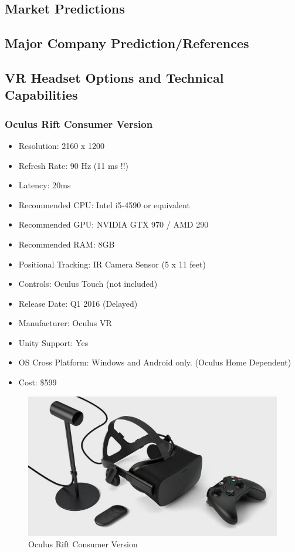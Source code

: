 \documentclass[a4paper,10pt,twoside]{article}
\begin{document}
\subsection{Market Predictions}

\subsection{Major Company Prediction/References}

\subsection{VR Headset Options and Technical Capabilities}
\pagebreak
\subsubsection{Oculus Rift Consumer Version}
\begin{itemize}
	\item Resolution: 2160 x 1200
	\item Refresh Rate: 90 Hz (11 ms !!)
	\item Latency: 20ms
	\item Recommended CPU: Intel i5-4590 or equivalent
	\item Recommended GPU: NVIDIA GTX 970 / AMD 290 
	\item Recommended RAM: 8GB
	\item Positional Tracking: IR Camera Sensor (5 x 11 feet)
	\item Controls: Oculus Touch (not included)
	\item Release Date: Q1 2016 (Delayed)
	\item Manufacturer: Oculus VR
	\item Unity Support: Yes
	\item OS Cross Platform: Windows and Android only. (Oculus Home Dependent)
	\item Cost: \$599
\end{itemize}
\begin{figure}[H]
	\includegraphics[width=\linewidth,height=\paperheight,keepaspectratio]{cv.jpg}
	\caption{Oculus Rift Consumer Version}
	\label{fig:RiftCVImg}
	\end{figure}
	\pagebreak
\end{document}
